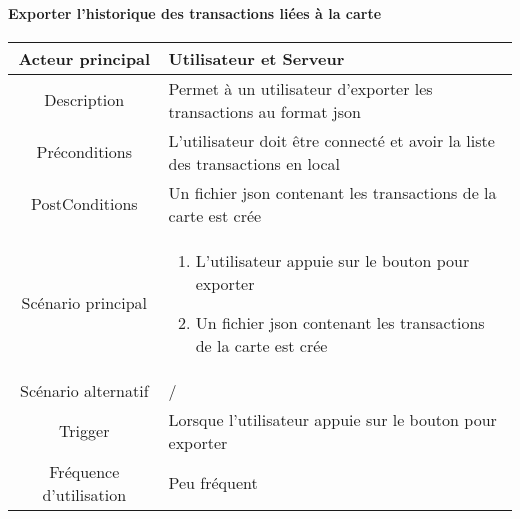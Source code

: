 \documentclass{article}
\begin{document}
\newpage

\paragraph{Exporter l'historique des transactions liées à la carte}
    \begin{table}[h]
        \begin{tabular}{|c|p{10cm}|}
        \hline
        Acteur principal& Utilisateur et Serveur    \\
        \hline
        Description&  Permet à un utilisateur d'exporter les transactions au format json  \\
        \hline
        Préconditions& L'utilisateur doit être connecté et avoir la liste des transactions en local \\
        \hline
        PostConditions&  Un fichier json contenant les transactions de la carte est crée   \\
        \hline
        Scénario principal& 
                \begin{enumerate}
                    \item L'utilisateur appuie sur le bouton pour exporter
                    \item Un fichier json contenant les transactions de la carte est crée
                \end{enumerate}     \\
        \hline
        Scénario alternatif&  /    \\
        \hline
        Trigger&   Lorsque l'utilisateur appuie sur le bouton pour exporter  \\
        \hline
        Fréquence d'utilisation&    Peu fréquent  \\
        \hline
        \end{tabular}
    \end{table}

\newpage
\end{document}

